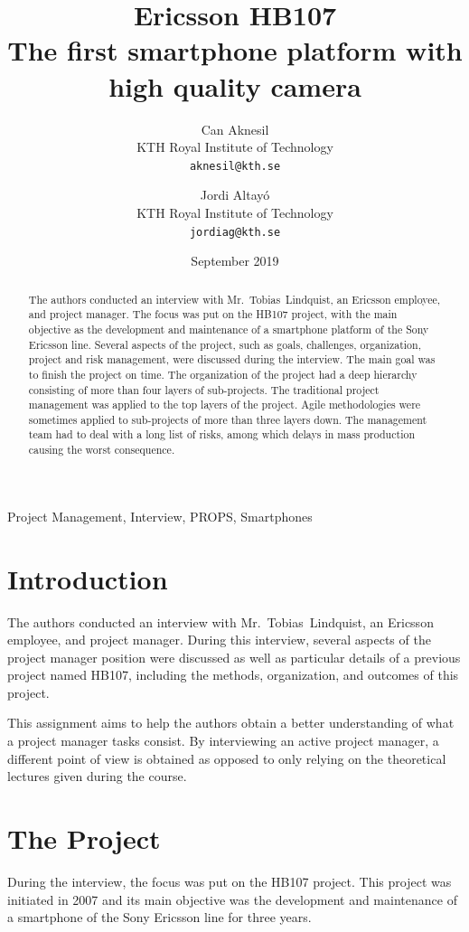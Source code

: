\documentclass[conference]{IEEEtran}
\title{Ericsson HB107\\[1ex]\LARGE{The first smartphone platform with high quality camera}}
\author{
    Can Aknesil\\KTH Royal Institute of Technology\\\texttt{aknesil@kth.se}
    
    \and
    
    Jordi Altayó\\KTH Royal Institute of Technology\\\texttt{jordiag@kth.se}
    }
\date{September 2019}
\begin{document}
\maketitle
\begin{abstract}
The authors conducted an interview with Mr.~Tobias~Lindquist, an Ericsson employee, and project manager. 
The focus was put on the HB107 project, with the main objective as the development and maintenance of a smartphone platform of the Sony Ericsson line. Several aspects of the project, such as goals, challenges, organization, project and risk management, were discussed during the interview. The main goal was to finish the project on time. The organization of the project had a deep hierarchy consisting of more than four layers of sub-projects. The traditional project management was applied to the top layers of the project. Agile methodologies were sometimes applied to sub-projects of more than three layers down. The management team had to deal with a long list of risks, among which delays in mass production causing the worst consequence.
\end{abstract}

\begin{IEEEkeywords}
    Project Management, Interview, PROPS, Smartphones
\end{IEEEkeywords}

\section{Introduction}
The authors conducted an interview with Mr.~Tobias~Lindquist, an Ericsson employee, and project manager. During this interview, several aspects of the project manager position were discussed as well as particular details of a previous project named HB107, including the methods, organization, and outcomes of this project. 

This assignment aims to help the authors obtain a better understanding of what a project manager tasks consist. By interviewing an active project manager, a different point of view is obtained as opposed to only relying on the theoretical lectures given during the course.

\section{The Project}
During the interview, the focus was put on the HB107 project. This project was initiated in 2007 and its main objective was the development and maintenance of a smartphone of the Sony Ericsson line for three years.
\end{document}
